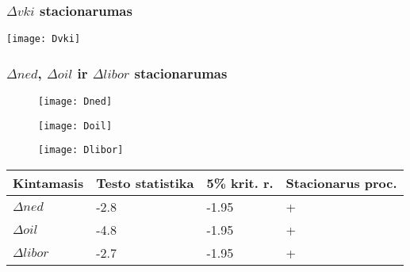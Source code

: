 \documentclass[utf8x,hyperref={unicode}]{beamer}
\begin{document}
\begin{frame}
\frametitle{$\Delta\textit{vki}$ stacionarumas}



\texttt{[image: Dvki]}

\end{frame}

\begin{frame}
\frametitle{$\Delta\textit{ned}$, $\Delta\textit{oil}$ ir $\Delta\textit{libor}$ stacionarumas}

\begin{figure}
\begin{minipage}[b]{0.32\linewidth}
\texttt{[image: Dned]}
\end{minipage}
\begin{minipage}[b]{0.32\linewidth}
\texttt{[image: Doil]}
\end{minipage}
\begin{minipage}[b]{0.32\linewidth}
\texttt{[image: Dlibor]}
\end{minipage}
\end{figure}

\begin{table}[!h]
\begin{center}
\begin{tabular}{llll}
  \hline
Kintamasis & Testo statistika & 5\% krit. r. & Stacionarus proc. \\ 
  \hline
$\Delta\textit{ned}$ & -2.8 & -1.95 & + \\
$\Delta\textit{oil}$ & -4.8 & -1.95 & + \\
$\Delta\textit{libor}$ & -2.7 & -1.95 & + \\ 
   \hline
\end{tabular}
\end{center}
\end{table}
\end{frame}
\end{document}
